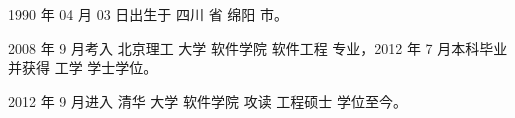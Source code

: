 \begin{resume}


  1990 年 04 月 03 日出生于 四川 省 绵阳 市。
  
  2008 年 9 月考入 北京理工 大学 软件学院 软件工程 专业，2012 年 7 月本科毕业并获得 工学 学士学位。
  
  2012 年 9 月进入 清华 大学 软件学院 攻读 工程硕士 学位至今。


\end{resume}

